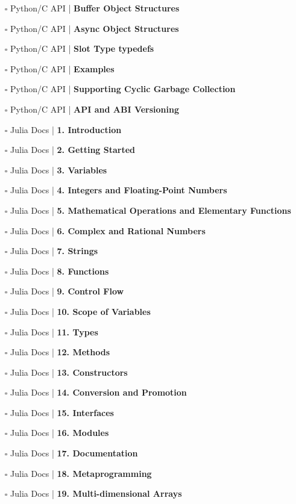 \documentclass[a4, landscape, 12pt]{article}
\newcommand{\checkbox}{$\square$}%
\begin{document}
\begin{itemize}
{}
\item [\checkbox]  Python/C API | \textbf{ Buffer Object Structures
}
\item [\checkbox]  Python/C API | \textbf{ Async Object Structures
}
\item [\checkbox]  Python/C API | \textbf{ Slot Type typedefs
}
\item [\checkbox]  Python/C API | \textbf{ Examples
}
\item [\checkbox]  Python/C API | \textbf{ Supporting Cyclic Garbage Collection
}
\item [\checkbox]  Python/C API | \textbf{ API and ABI Versioning
}
\item [\checkbox]  Julia Docs | \textbf{ 1. Introduction
}
\item [\checkbox]  Julia Docs | \textbf{ 2. Getting Started
}
\item [\checkbox]  Julia Docs | \textbf{ 3. Variables
}
\item [\checkbox]  Julia Docs | \textbf{ 4. Integers and Floating-Point Numbers
}
\item [\checkbox]  Julia Docs | \textbf{ 5. Mathematical Operations and Elementary Functions
}
\item [\checkbox]  Julia Docs | \textbf{ 6. Complex and Rational Numbers
}
\item [\checkbox]  Julia Docs | \textbf{ 7. Strings
}
\item [\checkbox]  Julia Docs | \textbf{ 8. Functions
}
\item [\checkbox]  Julia Docs | \textbf{ 9. Control Flow
}
\item [\checkbox]  Julia Docs | \textbf{ 10. Scope of Variables
}
\item [\checkbox]  Julia Docs | \textbf{ 11. Types
}
\item [\checkbox]  Julia Docs | \textbf{ 12. Methods
}
\item [\checkbox]  Julia Docs | \textbf{ 13. Constructors
}
\item [\checkbox]  Julia Docs | \textbf{ 14. Conversion and Promotion
}
\item [\checkbox]  Julia Docs | \textbf{ 15. Interfaces
}
\item [\checkbox]  Julia Docs | \textbf{ 16. Modules
}
\item [\checkbox]  Julia Docs | \textbf{ 17. Documentation
}
\item [\checkbox]  Julia Docs | \textbf{ 18. Metaprogramming
}
\item [\checkbox]  Julia Docs | \textbf{ 19. Multi-dimensional Arrays
}
\end{itemize}
\end{document}
